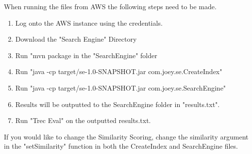 When running the files from AWS the following steps need to be made.
\begin{enumerate}
\item Log onto the AWS instance using the credentials.
\item Download the "Search Engine" Directory
\item Run "mvn package in the "SearchEngine" folder
\item Run "java -cp target/se-1.0-SNAPSHOT.jar com.joey.se.CreateIndex"
\item Run "java -cp target/se-1.0-SNAPSHOT.jar com.joey.se.SearchEngine"
\item Results will be outputted to the SearchEngine folder in "results.txt".
\item Run "Trec Eval" on the outputted results.txt.
\end{enumerate}
If you would like to change the Similarity Scoring, change the similarity argument in the "setSimilarity" function in both the CreateIndex and SearchEngine files.
